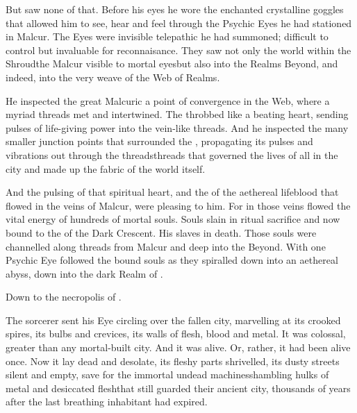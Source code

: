 But \Psyrex{} saw none of that. 
Before his eyes he wore the enchanted crystalline goggles that allowed him to see, hear and feel through the Psychic Eyes he had stationed in Malcur. 
The Eyes were invisible telepathic \daemons{} he had summoned; difficult to control but invaluable for reconnaisance. 
They saw not only the world within the Shroud\dash the Malcur visible to mortal eyes\dash but also into the Realms Beyond, and indeed, into the very weave of the Web of Realms. 

He inspected the great Malcuric \nexus{}\dash a point of convergence in the Web, where a myriad threads met and intertwined. 
The \nexus{} throbbed like a beating heart, sending pulses of life-giving power into the vein-like threads. 
And he inspected the many smaller junction points that surrounded the \nexus, propagating its pulses and vibrations out through the threads\dash threads that governed the lives of all in the city and made up the fabric of the world itself. 

And the pulsing of that spiritual heart, and the \colour of the aethereal lifeblood that flowed in the veins of Malcur, were pleasing to him. 
For in those veins flowed the vital energy of hundreds of mortal souls. 
Souls slain in ritual sacrifice and now bound to the \Matrix{} of the Dark Crescent. 
His slaves in death. 
Those souls were channelled along threads from Malcur and deep into the Beyond. 
With one Psychic Eye \Psyrex{} followed the bound souls as they spiralled down into an aethereal abyss, down into the dark Realm of \Machai. 

Down to the necropolis of \Nithdornazsh. 

The sorcerer sent his Eye circling over the fallen city, marvelling at its crooked spires, its bulbs and crevices, its walls of flesh, blood and metal. 
It was colossal, greater than any mortal-built city. 
And it was alive. 
Or, rather, it had been alive once. 
Now it lay dead and desolate, its fleshy parts shrivelled, its dusty streets silent and empty, save for the immortal undead machines\dash shambling hulks of metal and desiccated flesh\dash that still guarded their ancient city, thousands of years after the last breathing inhabitant had expired. 

